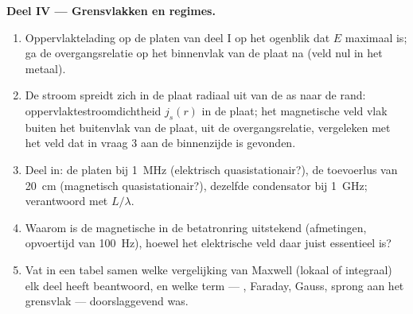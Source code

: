 \begin{problem}
\medskip
\noindent\textbf{Deel IV --- Grensvlakken en regimes.}
\begin{enumerate}[resume]
  \item Oppervlaktelading op de platen van deel I op het ogenblik dat $E$
        maximaal is; ga de overgangsrelatie op het binnenvlak van de plaat
        na (veld nul in het metaal).
  \item De stroom spreidt zich in de plaat radiaal uit van de as naar de
        rand: oppervlaktestroomdichtheid $j_s(r)$ in de plaat; het
        magnetische veld vlak buiten het buitenvlak van de plaat, uit de
        overgangsrelatie, vergeleken met het veld dat in vraag 3 aan de
        binnenzijde is gevonden.
  \item Deel in: de platen bij \qty{1}{MHz} (elektrisch quasistationair?),
        de toevoerlus van \qty{20}{cm} (magnetisch quasistationair?),
        dezelfde condensator bij \qty{1}{GHz}; verantwoord met $L/\lambda$.
  \item Waarom is de magnetische  in de
        betatronring uitstekend (afmetingen, opvoertijd van \qty{100}{Hz}),
        hoewel het elektrische veld daar juist essentieel is?
  \item Vat in een tabel samen welke vergelijking van Maxwell (lokaal of
        integraal) elk deel heeft beantwoord, en welke term ---
        , Faraday, Gauss, sprong aan het grensvlak ---
        doorslaggevend was.
\end{enumerate}
\end{problem}
